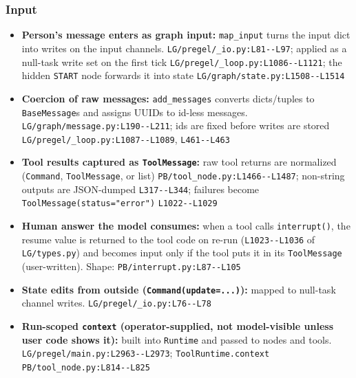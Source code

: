 \subsubsection*{Input}
\begin{itemize}
\item \textbf{Person's message enters as graph input:} \texttt{map\_\allowbreak{}input} turns the input dict into writes on the input channels. \texttt{LG/\allowbreak{}pregel/\allowbreak{}\_\allowbreak{}io.\allowbreak{}py:\allowbreak{}L81-\allowbreak{}-\allowbreak{}L97}; applied as a null-task write set on the first tick \texttt{LG/\allowbreak{}pregel/\allowbreak{}\_\allowbreak{}loop.\allowbreak{}py:\allowbreak{}L1086-\allowbreak{}-\allowbreak{}L1121}; the hidden \texttt{START} node forwards it into state \texttt{LG/\allowbreak{}graph/\allowbreak{}state.\allowbreak{}py:\allowbreak{}L1508-\allowbreak{}-\allowbreak{}L1514}
\item \textbf{Coercion of raw messages:} \texttt{add\_\allowbreak{}messages} converts dicts/tuples to \texttt{BaseMessage}s and assigns UUIDs to id-less messages. \texttt{LG/\allowbreak{}graph/\allowbreak{}message.\allowbreak{}py:\allowbreak{}L190-\allowbreak{}-\allowbreak{}L211}; ids are fixed before writes are stored \texttt{LG/\allowbreak{}pregel/\allowbreak{}\_\allowbreak{}loop.\allowbreak{}py:\allowbreak{}L1087-\allowbreak{}-\allowbreak{}L1089}, \texttt{L461-\allowbreak{}-\allowbreak{}L463}
\item \textbf{Tool results captured as \texttt{ToolMessage}:} raw tool returns are normalized (\texttt{Command}, \texttt{ToolMessage}, or list) \texttt{PB/\allowbreak{}tool\_\allowbreak{}node.\allowbreak{}py:\allowbreak{}L1466-\allowbreak{}-\allowbreak{}L1487}; non-string outputs are JSON-dumped \texttt{L317-\allowbreak{}-\allowbreak{}L344}; failures become \texttt{ToolMessage(\allowbreak{}status="error")} \texttt{L1022-\allowbreak{}-\allowbreak{}L1029}
\item \textbf{Human answer the model consumes:} when a tool calls \texttt{interrupt(\allowbreak{})}, the resume value is returned to the tool code on re-run (\texttt{L1023-\allowbreak{}-\allowbreak{}L1036} of \texttt{LG/\allowbreak{}types.\allowbreak{}py}) and becomes input only if the tool puts it in its \texttt{ToolMessage} (user-written). Shape: \texttt{PB/\allowbreak{}interrupt.\allowbreak{}py:\allowbreak{}L87-\allowbreak{}-\allowbreak{}L105}
\item \textbf{State edits from outside (\texttt{Command(\allowbreak{}update=.\allowbreak{}.\allowbreak{}.\allowbreak{})}):} mapped to null-task channel writes. \texttt{LG/\allowbreak{}pregel/\allowbreak{}\_\allowbreak{}io.\allowbreak{}py:\allowbreak{}L76-\allowbreak{}-\allowbreak{}L78}
\item \textbf{Run-scoped \texttt{context} (operator-supplied, not model-visible unless user code shows it):} built into \texttt{Runtime} and passed to nodes and tools. \texttt{LG/\allowbreak{}pregel/\allowbreak{}main.\allowbreak{}py:\allowbreak{}L2963-\allowbreak{}-\allowbreak{}L2973}; \texttt{ToolRuntime.\allowbreak{}context} \texttt{PB/\allowbreak{}tool\_\allowbreak{}node.\allowbreak{}py:\allowbreak{}L814-\allowbreak{}-\allowbreak{}L825}
\end{itemize}

